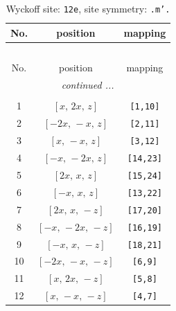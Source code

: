 \documentclass[fleqn,8pt]{jsarticle}
\begin{document}
\begin{longtable}{ccc}
\caption{Wyckoff site: {\tt 12e}, site symmetry: {\tt .m'.}}
 \\
 \hline \hline
No. & position & mapping \\ \hline \endfirsthead

\multicolumn{2}{l}{\tablename\ \thetable{}} \\
 \hline \hline
No. & position & mapping \\ \hline \endhead

 \hline \hline
\multicolumn{2}{r}{\footnotesize\it continued ...} \\ \endfoot

 \hline \hline
\multicolumn{2}{r}{} \\ \endlastfoot

1 & $\left[ x,\, 2 x,\, z \right]$ & {\tt [1,10]} \\ \hline
2 & $\left[ - 2 x,\, - x,\, z \right]$ & {\tt [2,11]} \\ \hline
3 & $\left[ x,\, - x,\, z \right]$ & {\tt [3,12]} \\ \hline
4 & $\left[ - x,\, - 2 x,\, z \right]$ & {\tt [14,23]} \\ \hline
5 & $\left[ 2 x,\, x,\, z \right]$ & {\tt [15,24]} \\ \hline
6 & $\left[ - x,\, x,\, z \right]$ & {\tt [13,22]} \\ \hline
7 & $\left[ 2 x,\, x,\, - z \right]$ & {\tt [17,20]} \\ \hline
8 & $\left[ - x,\, - 2 x,\, - z \right]$ & {\tt [16,19]} \\ \hline
9 & $\left[ - x,\, x,\, - z \right]$ & {\tt [18,21]} \\ \hline
10 & $\left[ - 2 x,\, - x,\, - z \right]$ & {\tt [6,9]} \\ \hline
11 & $\left[ x,\, 2 x,\, - z \right]$ & {\tt [5,8]} \\ \hline
12 & $\left[ x,\, - x,\, - z \right]$ & {\tt [4,7]} \\
\end{longtable}
\renewcommand{\arraystretch}{1.2}
\end{document}
